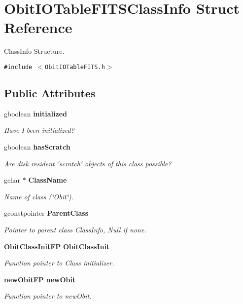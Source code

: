 \section{Obit\-IOTable\-FITSClass\-Info Struct Reference}
\label{structObitIOTableFITSClassInfo}
Class\-Info Structure.  


{\tt \#include $<$Obit\-IOTable\-FITS.h$>$}

\subsection*{Public Attributes}
\begin{CompactItemize}
\item 
gboolean {\bf initialized}
\begin{CompactList}\small\item\em Have I been initialized? \item\end{CompactList}\item 
gboolean {\bf has\-Scratch}
\begin{CompactList}\small\item\em Are disk resident \char`\"{}scratch\char`\"{} objects of this class possible? \item\end{CompactList}\item 
gchar $\ast$ {\bf Class\-Name}
\begin{CompactList}\small\item\em Name of class (\char`\"{}Obit\char`\"{}). \item\end{CompactList}\item 
gconstpointer {\bf Parent\-Class}
\begin{CompactList}\small\item\em Pointer to parent class Class\-Info, Null if none. \item\end{CompactList}\item 
{\bf Obit\-Class\-Init\-FP} {\bf Obit\-Class\-Init}
\begin{CompactList}\small\item\em Function pointer to Class initializer. \item\end{CompactList}\item 
{\bf new\-Obit\-FP} {\bf new\-Obit}
\begin{CompactList}\small\item\em Function pointer to new\-Obit. \item\end{CompactList}\item 

\end{CompactItemize}
